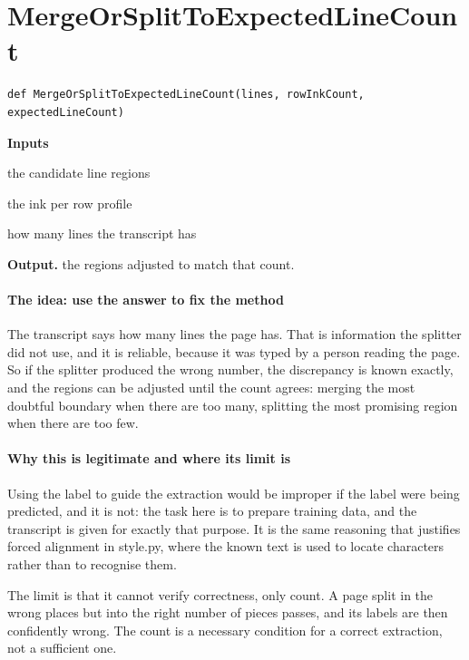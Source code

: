 \section{MergeOrSplitToExpectedLineCount}
\begin{lstlisting}[style=sig]
def MergeOrSplitToExpectedLineCount(lines, rowInkCount, expectedLineCount)
\end{lstlisting}

\noindent\textbf{Inputs}
\begin{description}[leftmargin=2.2em,style=nextline,font=\normalfont\ttfamily]\setlength\itemsep{1pt}
  \item[{lines}] \normalfont the candidate line regions
  \item[{rowInkCount}] \normalfont the ink per row profile
  \item[{expectedLineCount}] \normalfont how many lines the transcript has
\end{description}

\noindent\textbf{Output.} the regions adjusted to match that count.


\paragraph{The idea: use the answer to fix the method}
The transcript says how many lines the page has. That is information the splitter did not use, and it is reliable, because it was typed by a person reading the page. So if the splitter produced the wrong number, the discrepancy is known exactly, and the regions can be adjusted until the count agrees: merging the most doubtful boundary when there are too many, splitting the most promising region when there are too few.


\paragraph{Why this is legitimate and where its limit is}
Using the label to guide the extraction would be improper if the label were being predicted, and it is not: the task here is to prepare training data, and the transcript is given for exactly that purpose. It is the same reasoning that justifies forced alignment in style.py, where the known text is used to locate characters rather than to recognise them.

The limit is that it cannot verify correctness, only count. A page split in the wrong places but into the right number of pieces passes, and its labels are then confidently wrong. The count is a necessary condition for a correct extraction, not a sufficient one.


